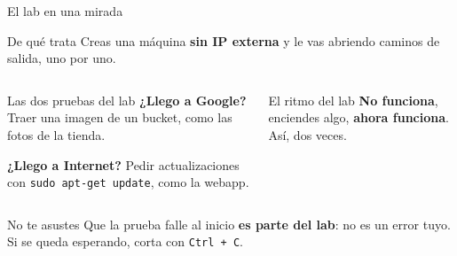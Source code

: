 \documentclass[aspectratio=169,10pt,c]{beamer}
\begin{document}
\begin{frame}{El lab en una mirada}
\begin{block}{De qué trata}
\small Creas una máquina \textbf{sin IP externa} y le vas abriendo caminos de salida, uno por uno.
\end{block}
\begin{center}
\end{center}
\begin{columns}[T,onlytextwidth]
\begin{block}{Las dos pruebas del lab}
\small \textbf{¿Llego a Google?} Traer una imagen de un bucket, como las fotos de la tienda.\par\smallskip
\textbf{¿Llego a Internet?} Pedir actualizaciones con \texttt{sudo apt-get update}, como la webapp.
\end{block}
\begin{exampleblock}{El ritmo del lab}
\small \textbf{No funciona}, enciendes algo, \textbf{ahora funciona}. Así, dos veces.
\end{exampleblock}
\end{columns}
\par\vspace{1mm}
\begin{alertblock}{No te asustes}
\small Que la prueba falle al inicio \textbf{es parte del lab}: no es un error tuyo. Si se queda esperando, corta con \texttt{Ctrl + C}.
\end{alertblock}
\end{frame}
\end{document}
